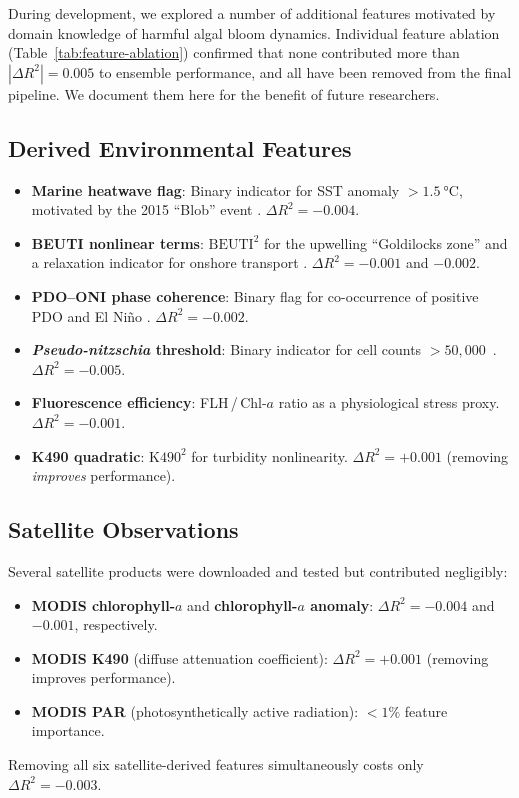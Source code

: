 \documentclass[toxins,article,submit,moreauthors]{Definitions/mdpi}
\begin{document}
During development, we explored a number of additional features motivated by domain knowledge of harmful algal bloom dynamics. Individual feature ablation (Table~\ref{tab:feature-ablation}) confirmed that none contributed more than $|\Delta R^2| = 0.005$ to ensemble performance, and all have been removed from the final pipeline. We document them here for the benefit of future researchers.

\subsection*{Derived Environmental Features}

\begin{itemize}[nosep]
    \item \textbf{Marine heatwave flag}: Binary indicator for SST anomaly $> \SI{1.5}{\degreeCelsius}$, motivated by the 2015 ``Blob'' event \cite{Bond2015, McCabe2016}. $\Delta R^2 = -0.004$.
    \item \textbf{BEUTI nonlinear terms}: $\text{BEUTI}^2$ for the upwelling ``Goldilocks zone'' \cite{Trainer2020} and a relaxation indicator for onshore transport \cite{Trainer2002}. $\Delta R^2 = -0.001$ and $-0.002$.
    \item \textbf{PDO--ONI phase coherence}: Binary flag for co-occurrence of positive PDO and El Ni\~no \cite{McKibben2017}. $\Delta R^2 = -0.002$.
    \item \textbf{\textit{Pseudo-nitzschia} threshold}: Binary indicator for cell counts $> 50{,}000$~\si{\cellsperL}. $\Delta R^2 = -0.005$.
    \item \textbf{Fluorescence efficiency}: FLH\,/\,Chl-$a$ ratio as a physiological stress proxy. $\Delta R^2 = -0.001$.
    \item \textbf{K490 quadratic}: $\text{K490}^2$ for turbidity nonlinearity. $\Delta R^2 = +0.001$ (removing \textit{improves} performance).
\end{itemize}

\subsection*{Satellite Observations}

Several satellite products were downloaded and tested but contributed negligibly:
\begin{itemize}[nosep]
    \item \textbf{MODIS chlorophyll-$a$} and \textbf{chlorophyll-$a$ anomaly}: $\Delta R^2 = -0.004$ and $-0.001$, respectively.
    \item \textbf{MODIS K490} (diffuse attenuation coefficient): $\Delta R^2 = +0.001$ (removing improves performance).
    \item \textbf{MODIS PAR} (photosynthetically active radiation): $< 1\%$ feature importance.
\end{itemize}
Removing all six satellite-derived features simultaneously costs only $\Delta R^2 = -0.003$.
\end{document}

